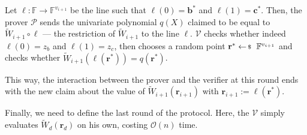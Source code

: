 \begin{proposition}
    Let $\ell: \mathbb{F} \to \mathbb{F}^{v_{i+1}}$ be the line such that
    $\ell(0)=\boldsymbol{b}^*$ and $\ell(1)=\boldsymbol{c}^*$. Then, the prover
    $\mathcal{P}$ sends the univariate polynomial $q(X)$ claimed to be equal to
    $\widetilde{W}_{i+1} \circ \ell$ --- the restriction of
    $\widetilde{W}_{i+1}$ to the line $\ell$. $\mathcal{V}$ checks whether
    indeed $\ell(0)=z_b$ and $\ell(1)=z_c$, then chooses a random point
    $\mathbf{r}^* \leftarrowS \mathbb{F}^{v_{i+1}}$ and checks whether
    $\widetilde{W}_{i+1}(\ell(\mathbf{r}^*)) = q(\mathbf{r}^*)$.
\end{proposition}

This way, the interaction between the prover and the verifier at this round ends
with the new claim about the value of $\widetilde{W}_{i+1}(\mathbf{r}_{i+1})$
with $\mathbf{r}_{i+1} := \ell(\mathbf{r}^*)$.

Finally, we need to define the last round of the protocol. Here, 
the $\mathcal{V}$ simply evaluates $\widetilde{W}_d(\mathbf{r}_d)$
on his own, costing $\mathcal{O}(n)$ time. 

